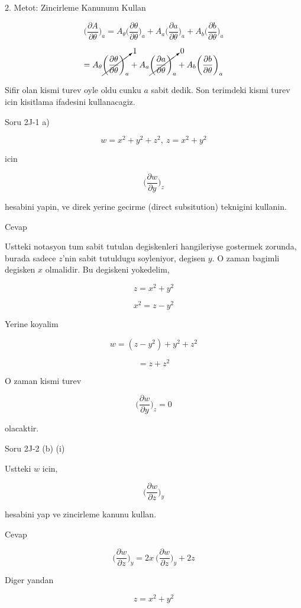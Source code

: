 \documentclass[12pt,fleqn]{article}\usepackage{../common}
\begin{document}
2. Metot: Zincirleme Kanununu Kullan

\[ \bigg( \frac{\partial A}{\partial \theta} \bigg)_{a} = 
A_\theta \bigg( \frac{\partial \theta}{\partial \theta} \bigg)_{a} + 
A_a \bigg( \frac{\partial a}{\partial \theta} \bigg)_{a} + 
A_b \bigg( \frac{\partial b}{\partial \theta} \bigg)_{a} 
 \]

\[  = 
A_\theta \cancelto{1}{\bigg( \frac{\partial \theta}{\partial \theta} \bigg)_{a}} + 
A_a \cancelto{0}{\bigg( \frac{\partial a}{\partial \theta} \bigg)_{a}} + 
A_b \bigg( \frac{\partial b}{\partial \theta} \bigg)_{a}
 \]

Sifir olan kismi turev oyle oldu cunku $a$ sabit dedik. Son terimdeki
kismi turev icin kisitlama ifadesini kullanacagiz.

Soru 2J-1 a)

\[ w = x^2+y^2+z^2, \ z = x^2+y^2 \]

icin 

\[ \bigg( \frac{\partial w}{\partial y}  \bigg)_z \]

hesabini yapin, ve direk yerine gecirme (direct subsitution) teknigini
kullanin. 

Cevap 

Ustteki notasyon tum sabit tutulan degiskenleri hangileriyse gostermek
zorunda, burada sadece $z$'nin sabit tutuldugu soyleniyor, degisen $y$. O
zaman bagimli degisken $x$ olmalidir. Bu degiskeni yokedelim,

\[ z = x^2+y^2 \]

\[ x^2 = z - y^2 \]

Yerine koyalim

\[  w = (z-y^2)+y^2+z^2 \]

\[ = z + z^2 \]

O zaman kismi turev

\[ \bigg( \frac{\partial w}{\partial y}  \bigg)_z  = 0\]

olacaktir. 

Soru 2J-2 (b) (i)

Ustteki $w$ icin, 

\[ \bigg( \frac{\partial w}{\partial z}  \bigg)_y \]

hesabini yap ve zincirleme kanunu kullan. 

Cevap 

\[  \bigg( \frac{\partial w}{\partial z}  \bigg)_y  =
2x \  \bigg( \frac{\partial w}{\partial z}  \bigg)_y  +  2z
 \]

Diger yandan 

\[ z = x^2 + y^2 \]
\end{document}
